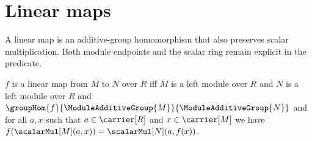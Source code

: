 


\section{Linear maps}

A linear map is an additive-group homomorphism that also preserves scalar
multiplication.  Both module endpoints and the scalar ring remain explicit in
the predicate.

\begin{definition}\label{linear_map}
    $f$ is a linear map from $M$ to $N$ over $R$ iff
        $M$ is a left module over $R$ and
        $N$ is a left module over $R$ and
        $\groupHom{f}{\ModuleAdditiveGroup{M}}{
            \ModuleAdditiveGroup{N}}$ and
        for all $a,x$ such that
            $a\in\carrier[R]$ and $x\in\carrier[M]$ we have
            $f(\scalarMul[M](a,x))=\scalarMul[N](a,f(x))$.
\end{definition}

